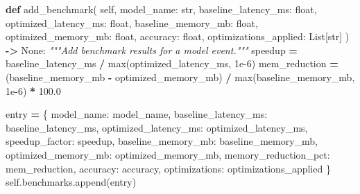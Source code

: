\documentclass[
  letterpaper,
]{scrbook}
\newenvironment{Shaded}{\begin{snugshade}}{\end{snugshade}}
\newcommand{\BuiltInTok}[1]{#1}
\newcommand{\CommentTok}[1]{\textcolor[rgb]{0.56,0.35,0.01}{\textit{#1}}}
\newcommand{\FloatTok}[1]{\textcolor[rgb]{0.00,0.00,0.81}{#1}}
\newcommand{\KeywordTok}[1]{\textcolor[rgb]{0.13,0.29,0.53}{\textbf{#1}}}
\newcommand{\NormalTok}[1]{#1}
\newcommand{\OperatorTok}[1]{\textcolor[rgb]{0.81,0.36,0.00}{\textbf{#1}}}
\newcommand{\StringTok}[1]{\textcolor[rgb]{0.31,0.60,0.02}{#1}}
\newcommand{\VariableTok}[1]{\textcolor[rgb]{0.00,0.00,0.00}{#1}}
\begin{document}
\begin{Shaded}
\begin{Highlighting}[]
    \KeywordTok{def}\NormalTok{ add\_benchmark(}
        \VariableTok{self}\NormalTok{,}
\NormalTok{        model\_name: }\BuiltInTok{str}\NormalTok{,}
\NormalTok{        baseline\_latency\_ms: }\BuiltInTok{float}\NormalTok{,}
\NormalTok{        optimized\_latency\_ms: }\BuiltInTok{float}\NormalTok{,}
\NormalTok{        baseline\_memory\_mb: }\BuiltInTok{float}\NormalTok{,}
\NormalTok{        optimized\_memory\_mb: }\BuiltInTok{float}\NormalTok{,}
\NormalTok{        accuracy: }\BuiltInTok{float}\NormalTok{,}
\NormalTok{        optimizations\_applied: List[}\BuiltInTok{str}\NormalTok{]}
\NormalTok{    ) }\OperatorTok{{-}\textgreater{}} \VariableTok{None}\NormalTok{:}
        \CommentTok{"""Add benchmark results for a model event."""}
\NormalTok{        speedup }\OperatorTok{=}\NormalTok{ baseline\_latency\_ms }\OperatorTok{/} \BuiltInTok{max}\NormalTok{(optimized\_latency\_ms, }\FloatTok{1e{-}6}\NormalTok{)}
\NormalTok{        mem\_reduction }\OperatorTok{=}\NormalTok{ (baseline\_memory\_mb }\OperatorTok{{-}}\NormalTok{ optimized\_memory\_mb) }\OperatorTok{/} \BuiltInTok{max}\NormalTok{(baseline\_memory\_mb, }\FloatTok{1e{-}6}\NormalTok{) }\OperatorTok{*} \FloatTok{100.0}

\NormalTok{        entry }\OperatorTok{=}\NormalTok{ \{}
            \StringTok{\textquotesingle{}model\_name\textquotesingle{}}\NormalTok{: model\_name,}
            \StringTok{\textquotesingle{}baseline\_latency\_ms\textquotesingle{}}\NormalTok{: baseline\_latency\_ms,}
            \StringTok{\textquotesingle{}optimized\_latency\_ms\textquotesingle{}}\NormalTok{: optimized\_latency\_ms,}
            \StringTok{\textquotesingle{}speedup\_factor\textquotesingle{}}\NormalTok{: speedup,}
            \StringTok{\textquotesingle{}baseline\_memory\_mb\textquotesingle{}}\NormalTok{: baseline\_memory\_mb,}
            \StringTok{\textquotesingle{}optimized\_memory\_mb\textquotesingle{}}\NormalTok{: optimized\_memory\_mb,}
            \StringTok{\textquotesingle{}memory\_reduction\_pct\textquotesingle{}}\NormalTok{: mem\_reduction,}
            \StringTok{\textquotesingle{}accuracy\textquotesingle{}}\NormalTok{: accuracy,}
            \StringTok{\textquotesingle{}optimizations\textquotesingle{}}\NormalTok{: optimizations\_applied}
\NormalTok{        \}}
        \VariableTok{self}\NormalTok{.benchmarks.append(entry)}


\end{Highlighting}
\end{Shaded}
\end{document}
